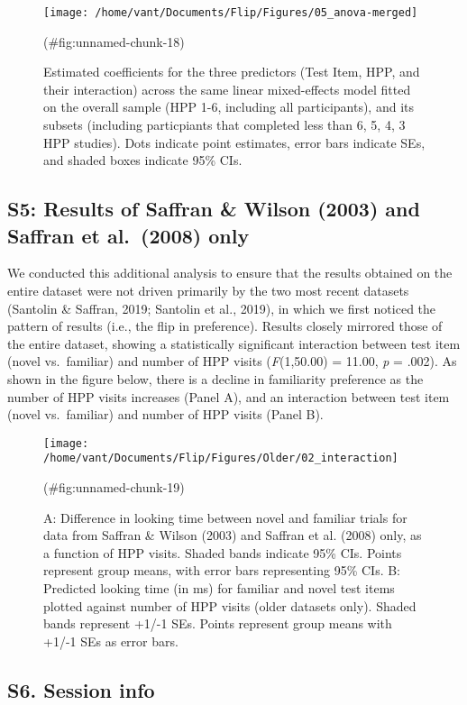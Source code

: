 \begin{appendix}
\begin{figure}
\texttt{[image: /home/vant/Documents/Flip/Figures/05\_anova-merged]} \caption{Estimated coefficients for the three predictors (Test Item, HPP, and their interaction) across the same linear mixed-effects model fitted on the overall sample (HPP 1-6, including all participants), and its subsets (including particpiants that completed less than 6, 5, 4, 3 HPP studies). Dots indicate point estimates, error bars indicate SEs, and shaded boxes indicate 95\% CIs.}(\#fig:unnamed-chunk-18)
\end{figure}

\hypertarget{s5}{%
\subsection{S5: Results of Saffran \& Wilson (2003) and Saffran et
al.~(2008) only}\label{s5}}

We conducted this additional analysis to ensure that the results
obtained on the entire dataset were not driven primarily by the two most
recent datasets (Santolin \& Saffran, 2019; Santolin et al., 2019), in
which we first noticed the pattern of results (i.e., the flip in
preference). Results closely mirrored those of the entire dataset,
showing a statistically significant interaction between test item (novel
vs.~familiar) and number of HPP visits (\emph{F}(1,50.00) = 11.00,
\emph{p} = .002). As shown in the figure below, there is a decline in
familiarity preference as the number of HPP visits increases (Panel A),
and an interaction between test item (novel vs.~familiar) and number of
HPP visits (Panel B).

\begin{figure}
\texttt{[image: /home/vant/Documents/Flip/Figures/Older/02\_interaction]} \caption{A: Difference in looking time between novel and familiar trials for data from Saffran \& Wilson (2003) and Saffran et al. (2008) only, as a function of HPP visits. Shaded bands indicate 95\% CIs. Points represent group means, with error bars representing 95\% CIs. B: Predicted looking time (in ms) for familiar and novel test items plotted against number of HPP visits (older datasets only). Shaded bands represent +1/-1 SEs. Points represent group means with +1/-1 SEs as error bars.}(\#fig:unnamed-chunk-19)
\end{figure}

\hypertarget{s6.-session-info}{%
\subsection*{S6. Session info}\label{s6.-session-info}}


\end{appendix}
